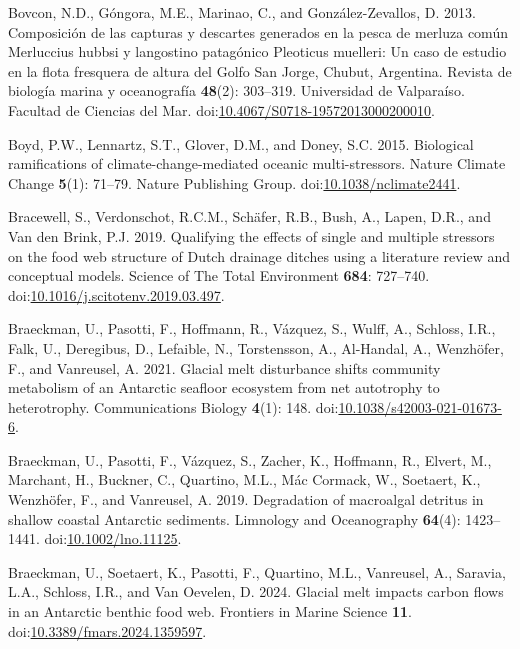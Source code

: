 \documentclass[
]{article}
\newlength{\cslhangindent}
\newenvironment{CSLReferences}[2] %
 {\begin{list}{}{%
  \setlength{\itemindent}{0pt}
  \setlength{\leftmargin}{0pt}
  \setlength{\parsep}{0pt}
  \ifodd #1
   \setlength{\leftmargin}{\cslhangindent}
   \setlength{\itemindent}{-1\cslhangindent}
  \fi
  \setlength{\itemsep}{#2\baselineskip}}}
 {\end{list}}
\begin{document}
\begin{CSLReferences}{1}{0}
Bovcon, N.D., Góngora, M.E., Marinao, C., and González-Zevallos, D.
2013. Composici{ó}n de las capturas y descartes generados en la pesca de
merluza com{ú}n {Merluccius} hubbsi y langostino patag{ó}nico
{Pleoticus} muelleri: Un caso de estudio en la flota fresquera de altura
del {Golfo San Jorge}, {Chubut}, {Argentina}. Revista de biolog{í}a
marina y oceanograf{í}a \textbf{48}(2): 303--319. Universidad de
Valpara{í}so. Facultad de Ciencias del Mar.
doi:\href{https://doi.org/10.4067/S0718-19572013000200010}{10.4067/S0718-19572013000200010}.

Boyd, P.W., Lennartz, S.T., Glover, D.M., and Doney, S.C. 2015.
Biological ramifications of climate-change-mediated oceanic
multi-stressors. Nature Climate Change \textbf{5}(1): 71--79. Nature
Publishing Group.
doi:\href{https://doi.org/10.1038/nclimate2441}{10.1038/nclimate2441}.

Bracewell, S., Verdonschot, R.C.M., Schäfer, R.B., Bush, A., Lapen,
D.R., and Van den Brink, P.J. 2019. Qualifying the effects of single and
multiple stressors on the food web structure of {Dutch} drainage ditches
using a literature review and conceptual models. Science of The Total
Environment \textbf{684}: 727--740.
doi:\href{https://doi.org/10.1016/j.scitotenv.2019.03.497}{10.1016/j.scitotenv.2019.03.497}.

Braeckman, U., Pasotti, F., Hoffmann, R., Vázquez, S., Wulff, A.,
Schloss, I.R., Falk, U., Deregibus, D., Lefaible, N., Torstensson, A.,
Al-Handal, A., Wenzhöfer, F., and Vanreusel, A. 2021. Glacial melt
disturbance shifts community metabolism of an {Antarctic} seafloor
ecosystem from net autotrophy to heterotrophy. Communications Biology
\textbf{4}(1): 148.
doi:\href{https://doi.org/10.1038/s42003-021-01673-6}{10.1038/s42003-021-01673-6}.

Braeckman, U., Pasotti, F., Vázquez, S., Zacher, K., Hoffmann, R.,
Elvert, M., Marchant, H., Buckner, C., Quartino, M.L., Mác Cormack, W.,
Soetaert, K., Wenzhöfer, F., and Vanreusel, A. 2019. Degradation of
macroalgal detritus in shallow coastal {Antarctic} sediments. Limnology
and Oceanography \textbf{64}(4): 1423--1441.
doi:\href{https://doi.org/10.1002/lno.11125}{10.1002/lno.11125}.

Braeckman, U., Soetaert, K., Pasotti, F., Quartino, M.L., Vanreusel, A.,
Saravia, L.A., Schloss, I.R., and Van Oevelen, D. 2024. Glacial melt
impacts carbon flows in an {Antarctic} benthic food web. Frontiers in
Marine Science \textbf{11}.
doi:\href{https://doi.org/10.3389/fmars.2024.1359597}{10.3389/fmars.2024.1359597}.


\end{CSLReferences}
\end{document}

